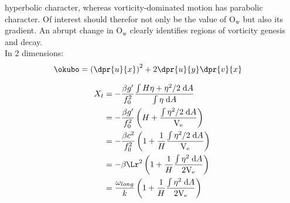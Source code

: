 \begin{derivation}
hyperbolic	character, whereas vorticity-dominated motion has parabolic
character. Of interest should therefor not only be the value of $\mathrm{O_w}$
but also its	gradient. An abrupt change in $\mathrm{O_w}$ clearly identifies
regions of	vorticity genesis and decay.
\\ In 2 dimensions:
\begin{equation}\begin{split}
\okubo
&=
\left(\dpr{u}{x}\right)^2
+
2 \dpr{u}{y} \dpr{v}{x}
\end{split}\end{equation}
\end{derivation}

\begin{derivation}

\begin{equation}\begin{split}
X_t
&=
-\frac{\beta g'}{f_0^2} \frac{\int H\eta + \eta^2/2 \; \mathrm{d}A}{\int\eta \; \mathrm{d}A}\\
&=
-\frac{\beta g'}{f_0^2} \left(H +\frac{ \int  \eta^2/2 \; \mathrm{d}A}{\mathrm{V_e}} \right) \\
&=
-\frac{\beta c^2}{f_0^2} \left(1 +\frac{1}{H} \frac{ \int  \eta^2/2 \;\mathrm{d}A	}{\mathrm{V_e}} \right) \\
&=
-\beta \Lr^2 \left(1 +\frac{1}{H} \frac{ \int  \eta^2 \; \mathrm{d}A}{2\mathrm{V_e}} \right) \\
&=
\frac{\omega_{long}}{k} \left(1 +\frac{1}{H} \frac{ \int  \eta^2 \;\mathrm{d}A}{2\mathrm{V_e}} \right) \\
\end{split}\end{equation}
\end{derivation}

